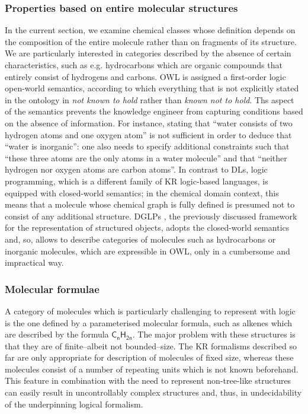 \documentclass[10pt]{bmc_article}
\newenvironment{bmcformat}{\baselineskip20pt\sloppy\setboolean{publ}{false}}{\baselineskip20pt\sloppy}
\begin{document}
\begin{bmcformat}
\subsubsection*{Properties based on entire molecular structures}  
\label{subsubsec:entire}

In the current section, we examine chemical classes whose definition depends on the composition of the entire molecule rather than on fragments of its structure. We are particularly interested in categories described by the absence of certain characteristics, such as e.g. hydrocarbons which are organic compounds that entirely consist of hydrogens and carbons. OWL is assigned a first-order logic open-world semantics, according to which everything that is not explicitly stated in the ontology in \emph{not known to hold} rather than \emph{known not to hold}. Ths aspect of the semantics prevents the knowledge engineer from capturing conditions based on the absence of information. For instance, stating that ``water consists of two hydrogen atoms and one oxygen atom'' is not sufficient in order to deduce that ``water is inorganic'': one also needs to specify additional constraints such that ``these three atoms are the only atoms in a water molecule'' and that ``neither hydrogen nor oxygen atoms are carbon atoms''. In contrast to DLs, logic programming, which is a different family of KR logic-based languages, is equipped with closed-world semantics; in the chemical domain context, this means that a molecule whose chemical graph is fully defined is presumed not to consist of any additional structure. DGLPs \cite{magka2011}, the previously discussed framework for the representation of structured objects, adopts the closed-world semantics and, so, allows to describe categories of molecules such as hydrocarbons or inorganic molecules, which are expressible in  OWL, only in a cumbersome and impractical way.

\subsubsection*{Molecular formulae}

A category of molecules which is particularly challenging to represent with logic is the one defined by a parameterised molecular formula, such as alkenes which are described by the formula $\mathsf{C_nH_{2n}}$. The major problem with these structures is that they are of finite--albeit not bounded--size. The KR formalisms described so far are only appropriate for description of molecules of fixed size, whereas these molecules consist of a number of repeating units which is not known beforehand.  This feature in combination with the need to represent non-tree-like structures can easily result in uncontrollably complex structures and, thus, in undecidability of the underpinning logical formalism. 


\end{bmcformat}
\end{document}
